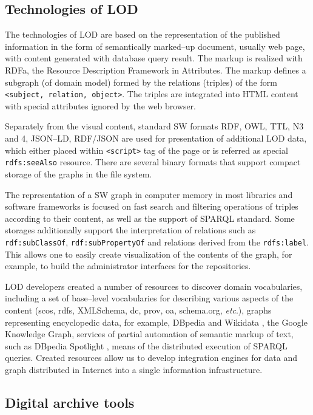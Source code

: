 \documentclass[conference,a4paper]{IEEEtran}
\begin{document}
\subsection{Technologies of LOD}

The technologies of LOD are based on the representation of the published information in the form of semantically marked--up document, usually web page, with content generated with database query result.  The markup is realized with RDFa, the Resource Description Framework in Attributes.  The markup defines a subgraph (of domain model) formed by the relations (triples) of the form \texttt{<subject, relation, object>}.  The triples are integrated into HTML content with special attributes ignored by the web browser.

Separately from the visual content, standard SW formats RDF, OWL, TTL, N3 and 4, JSON--LD, RDF/JSON are used for presentation of additional LOD data, which either placed within \texttt{<script>} tag of the page or is referred as special \texttt{rdfs:seeAlso} resource.  There are several binary formats that support compact storage of the graphs in the file system.

The representation of a SW graph in computer memory in most libraries and software frameworks is focused on fast search and filtering operations of triples according to their content, as well as the support of SPARQL standard.  Some storages additionally support the interpretation of relations such as \texttt{rdf:subClassOf}, \texttt{rdf:subPropertyOf} and relations derived from the \texttt{rdfs:label}.  This allows one to easily create visualization of the contents of the graph, for example, to build the administrator interfaces for the repositories.

LOD developers created a number of resources to discover domain vocabularies, including a set of base--level vocabularies for describing various aspects of the content (scos, rdfs, XMLSchema, dc, prov, oa, schema.org, \emph{etc}.), graphs representing encyclopedic data, for example, DBpedia \cite{b3} and Wikidata \cite{b4}, the Google Knowledge Graph, services of partial automation of semantic markup of text, such as DBpedia Spotlight \cite{b5}, means of the distributed execution of SPARQL queries.  Created resources allow us to develop integration engines for data and graph distributed in Internet into a single information infrastructure.

\subsection{Digital archive tools}
\end{document}
